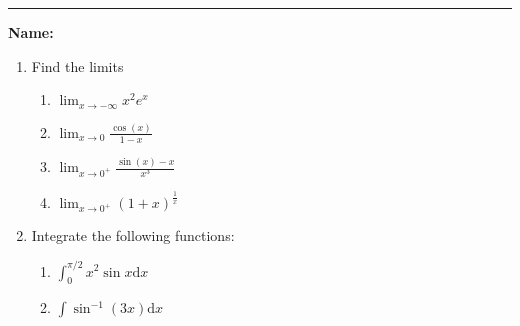 \documentclass[11pt]{article}
\begin{document}
    \hrule
    \vspace{.5cm}
    \noindent\textbf{Name:} \underline{\qquad\qquad\qquad\qquad\qquad\qquad\qquad\qquad\qquad\qquad\qquad\qquad\qquad}

    \begin{enumerate}
        \item Find the limits\\
        \begin{enumerate}
            \item  $\displaystyle \lim_{x\to -\infty} x^2 e^x$\vfill
            \item  $\displaystyle \lim_{x\to 0} \frac{\cos(x)}{1-x}$\vfill
            \item $\displaystyle \lim_{x\to 0^+} \frac{\sin(x)-x}{x^3}$\vfill
            \item $\displaystyle \lim_{x\to0^{+}}(1+x)^{\frac{1}{x}}$\vfill
        \end{enumerate}
        \newpage
        \item Integrate the following functions:
        \begin{enumerate}
            \item $\displaystyle \int_0^{\pi/2} x^2 \sin x \mathrm{d} x$\vfill
            \item $\displaystyle \int \sin^{-1}(3x) \mathrm{d} x$\vfill

\end{enumerate}
\end{enumerate}
\end{document}
